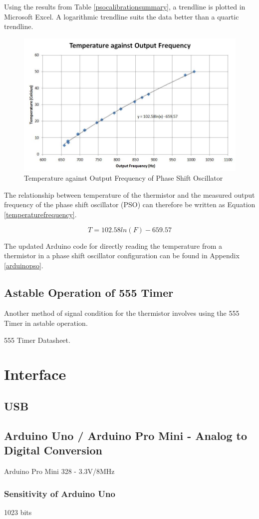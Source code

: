 Using the results from Table \ref{psocalibrationsummary}, a trendline is plotted in Microsoft Excel. A logarithmic trendline suits the data better than a quartic trendline. 

\begin{figure}[H]
	\centering
	\includegraphics[width=0.8\linewidth]{psocalibration.jpg}
	\caption{Temperature against Output Frequency of Phase Shift Oscillator}
	\label{psocalibrationplot}
\end{figure}

The relationship between temperature of the thermistor and the measured output frequency of the phase shift oscillator (PSO) can therefore be written as Equation \ref{temperaturefrequency}. 

\begin{equation}
T = 102.58 ln(F)-659.57 
\label{temperaturefrequency}
\end{equation}

The updated Arduino code for directly reading the temperature from a thermistor in a phase shift oscillator configuration can be found in Appendix \ref{arduinopso}.


\subsection{Astable Operation of 555 Timer}

Another method of signal condition for the thermistor involves using the 555 Timer in astable operation. 

555 Timer Datasheet. 

\section{Interface}

\subsection{USB}

\subsection{Arduino Uno / Arduino Pro Mini - Analog to Digital Conversion}
\label{arduino}

Arduino Pro Mini 328 - 3.3V/8MHz

\subsubsection{Sensitivity of Arduino Uno} 

1023 bits